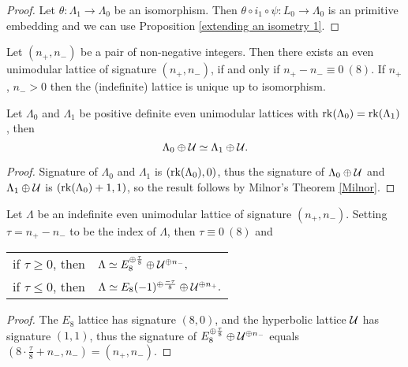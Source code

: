 \begin{proof}
    Let $\theta \colon \Lambda_1 \to \Lambda_0$ be an isomorphism. Then $\theta \circ i_1 \circ \psi \colon L_0 \to \Lambda_0$ is an primitive embedding and we can use Proposition \ref{extending an isometry 1}.
\end{proof}

\begin{theorem}[Milnor]
    \label{Milnor}
    Let $(n_+,n_-)$ be a pair of non-negative integers. Then there exists an even unimodular lattice of signature $(n_+, n_-)$, if and only if $n_+ - n_- \equiv 0 \ (8)$. If $n_+$, $n_- > 0$ then the (indefinite) lattice is unique up to isomorphism.
\end{theorem}

\begin{corollary}
    Let $\Lambda_0$ and $\Lambda_1$ be positive definite even unimodular lattices with $\operatorname{rk}(\Lambda_0) = \operatorname{rk}(\Lambda_1)$, then
    \[
        \Lambda_0 \oplus \mathcal U \simeq \Lambda_1 \oplus \mathcal U.
    \]
\end{corollary}

\begin{proof}
    Signature of $\Lambda_0$ and $\Lambda_1$ is $(\operatorname{rk}(\Lambda_0), 0)$, thus the signature of $\Lambda_0 \oplus \mathcal U$ and $\Lambda_1 \oplus \mathcal U$ is $(\operatorname{rk}(\Lambda_0) + 1, 1)$, so the result follows by Milnor's Theorem \ref{Milnor}.
\end{proof}

\begin{corollary}
    Let $\Lambda$ be an indefinite even unimodular lattice of signature $(n_+, n_-)$. Setting $\tau = n_+ - n_-$ to be the index of $\Lambda$, then $\tau \equiv 0 \ (8)$ and
    \begin{center}
        \begin{tabular}{r l}
            if $\tau \geq 0$, then & $\Lambda \simeq E_8^{\oplus \frac{\tau}{8}} \oplus \mathcal U^{\oplus n_-},$ \\
            if $\tau \leq 0$, then & $\Lambda \simeq E_8(-1)^{\oplus \frac{-\tau}{8}} \oplus \mathcal U^{\oplus n_+}.$
        \end{tabular}
    \end{center}
\end{corollary}

\begin{proof}
    The $E_8$ lattice has signature $(8,0)$, and the hyperbolic lattice $\mathcal U$ has signature $(1,1)$, thus the signature of $E_8^{\oplus \frac{\tau}{8}} \oplus \mathcal U^{\oplus n_-}$ equals $(8\cdot \tfrac{\tau}{8} + n_-,n_-) = (n_+, n_-)$.
\end{proof}

